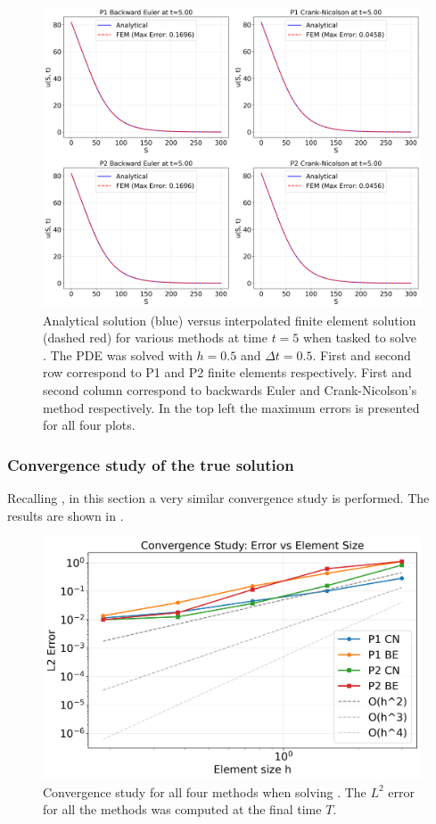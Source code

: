 \documentclass{article}
\begin{document}
\begin{figure}[!ht]
    \centering
    \includegraphics[width=0.95\linewidth]{code/images/fem_vs_analytical_BlackScholesTrue.png}
    \caption{Analytical solution (blue) versus interpolated finite element solution (dashed red) for various methods at time $t=5$ when tasked to solve . The PDE was solved with $h =0.5$ and $\Delta t = 0.5 $. First and second row correspond to P1 and P2 finite elements respectively. First and second column correspond to backwards Euler and Crank-Nicolson's method respectively. In the top left the maximum errors is presented for all four plots.}
    \label{fig:fem_vs_true_true}
\end{figure}

\subsubsection{Convergence study of the true solution}
Recalling , in this section a very similar convergence study is performed. The results are shown in . 
\begin{figure}[!ht]
    \centering
    \includegraphics[width=0.7\linewidth]{code/images/convergence_study_BlackScholesTrue.png}
    \caption{Convergence study for all four methods when solving . The $L^2$ error for all the methods was computed at the final time $T$.}
    \label{fig:conv_true}
\end{figure}
\end{document}
